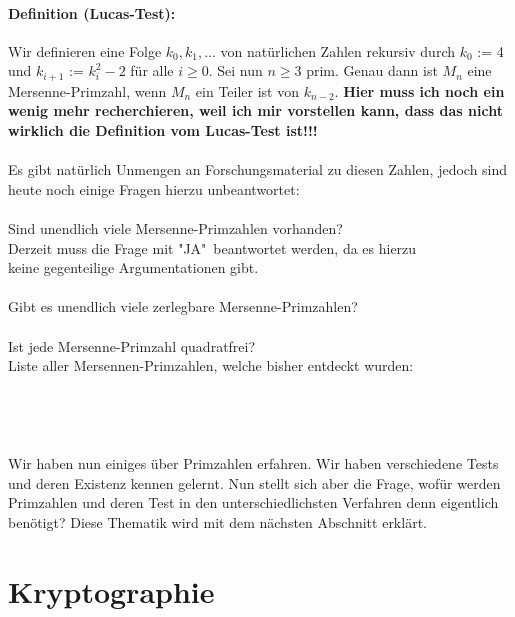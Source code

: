 \documentclass[german,12pt,a4paper]{article}
\begin{document}
\paragraph{Definition (Lucas-Test):}Wir definieren eine Folge $k_0,k_1,...$ von natürlichen Zahlen rekursiv durch $k_0$ := 4 und $k_{i+1}$ := $k_i^2-2$ für alle $i\geq 0$.
\newline Sei nun $n\geq 3$ prim. Genau dann ist $M_n$ eine Mersenne-Primzahl, wenn $M_n$ ein Teiler ist von $k_{n-2}$. \textbf{Hier muss ich noch ein wenig mehr recherchieren, weil ich mir vorstellen kann, dass das nicht wirklich die Definition vom Lucas-Test ist!!!}\\
\\Es gibt natürlich Unmengen an Forschungsmaterial zu diesen Zahlen, jedoch sind heute noch einige Fragen hierzu unbeantwortet:\\
\\Sind unendlich viele Mersenne-Primzahlen vorhanden?\\
\hspace*{15mm}Derzeit muss die Frage mit "JA"\ beantwortet werden, da es hierzu\\ 
\hspace*{15mm}keine gegenteilige Argumentationen gibt.\\
\\Gibt es unendlich viele zerlegbare Mersenne-Primzahlen?\\
\\Ist jede Mersenne-Primzahl quadratfrei?\\

Liste aller Mersennen-Primzahlen, welche bisher entdeckt wurden:\\\\\\\\\\









Wir haben nun einiges über Primzahlen erfahren. Wir haben verschiedene Tests und deren Existenz kennen gelernt. Nun stellt sich aber die Frage, wofür werden Primzahlen und deren Test in den unterschiedlichsten Verfahren denn eigentlich benötigt? Diese Thematik wird mit dem nächsten Abschnitt erklärt. \newpage


\section{Kryptographie}
\end{document}
